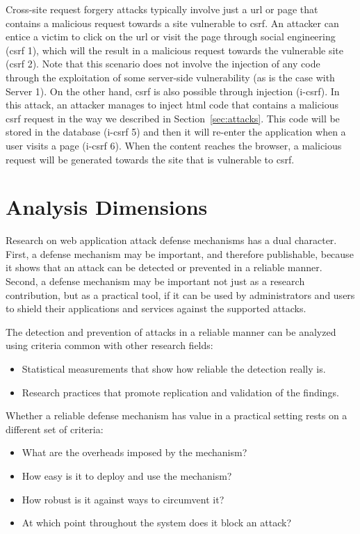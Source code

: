 \documentclass[10pt,journal,compsoc]{IEEEtran}
\begin{document}
Cross-site request forgery attacks typically involve just a
{\sc url} or page that contains a malicious request towards
a site vulnerable to {\sc csrf}.
An attacker can entice a victim to click on the {\sc url} or visit the page
through social engineering ({\sc csrf} 1), which will the result in a malicious
request towards the vulnerable site ({\sc csrf} 2).
Note that this scenario does not involve the injection of any code through the
exploitation of some server-side vulnerability (as is the case with Server 1).
On the other hand, {\sc csrf} is also possible through injection
({\sc i-csrf}). In this attack, an attacker
manages to inject {\sc html} code that contains
a malicious {\sc csrf} request in the way we described in
Section~\ref{sec:attacks}.
This code will be stored
in the database ({\sc i-csrf} 5)
and then it will re-enter the application when
a user visits a page ({\sc i-csrf} 6). When the
content reaches the browser, a malicious request will be generated
towards the site that is vulnerable to {\sc csrf}.


\section{Analysis Dimensions}
\label{sec:dimensions}

Research on web application attack defense mechanisms has a dual
character. First, a defense mechanism may be important, and therefore
publishable, because it shows that an attack can be detected or prevented in a
reliable manner. Second, a defense mechanism may be important not
just as a research contribution, but as a practical tool, if it can be
used by administrators and users to shield their applications
and services against the supported attacks.

The detection and prevention of attacks
in a reliable manner can be analyzed using
criteria common with other research fields:
\begin{itemize}
\item Statistical measurements that show how reliable the detection really
  is.
\item Research practices that promote replication and validation
of the findings.
\end{itemize}

Whether a reliable defense mechanism has value in a practical
setting rests on a different set of criteria:
\begin{itemize}
\item What are the overheads imposed by the mechanism?
\item How easy is it to deploy and use the mechanism?
\item How robust is it against ways to circumvent it?
\item At which point throughout the system does it block an attack?
\end{itemize}
\end{document}

